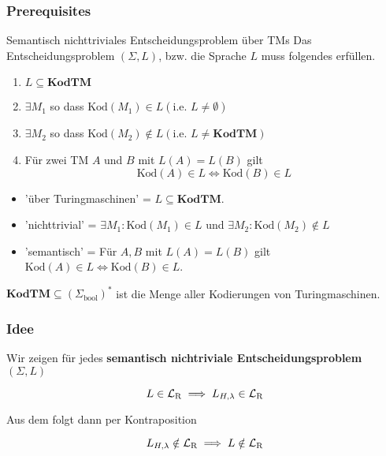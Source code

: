         \subsubsection{Prerequisites}
        \begin{mainbox}{Semantisch nichttriviales Entscheidungsproblem über TMs}
            Das Entscheidungsproblem $(\Sigma, L)$, bzw. die Sprache $L$ muss folgendes erfüllen.
            \begin{enumerate}[label=\Roman*.]
                
                \item $L \subseteq \textbf{KodTM}$
                
                \item $\exists M_1$ so dass $\text{Kod}(M_1) \in L (\text{i.e. } L \neq \emptyset)$
                \item $\exists M_2$ so dass $\text{Kod}(M_2) \notin L (\text{i.e. } L \neq \textbf{KodTM})$
                
                \item Für zwei TM $A$ und $B$ mit $L(A) = L(B)$ gilt
                $$\text{Kod}(A) \in L \iff \text{Kod}(B) \in L$$
            \end{enumerate}
        \end{mainbox}
        \begin{itemize}
            \item 'über Turingmaschinen' = $L \subseteq \textbf{KodTM}$.
            \item 'nichttrivial' = $\exists M_1: \text{Kod}(M_1) \in L$ und $\exists M_2: \text{Kod}(M_2) \notin L$
            \item 'semantisch' = Für $A, B$ mit $L(A) = L(B)$ gilt $\text{Kod}(A) \in L \iff \text{Kod}(B) \in L$.
        \end{itemize}
        $\textbf{KodTM}\subseteq (\Sigma_{\text{bool}})^*$ ist die Menge aller Kodierungen von Turingmaschinen.
    
    
        \subsubsection{Idee}
        Wir zeigen für jedes \textbf{semantisch nichtriviale Entscheidungsproblem} $(\Sigma, L)$
        
        $$L \in \mathcal{L}_\text{R} \implies L_{H, \lambda} \in \mathcal{L}_\text{R}$$
        
        Aus dem folgt dann per Kontraposition 
    
        $$L_{H, \lambda} \notin \mathcal{L}_\text{R} \implies L \notin \mathcal{L}_\text{R}$$
        
